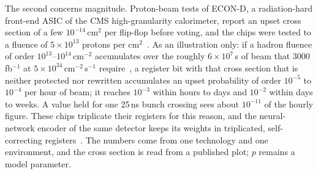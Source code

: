 The second concerns magnitude. Proton-beam tests of ECON-D, a radiation-hard front-end ASIC of the CMS high-granularity calorimeter, report an upset cross section of a few $10^{-14}$\,cm$^2$ per flip-flop before voting, and the chips were tested to a fluence of $5\times10^{13}$ protons per cm$^2$~\cite{cummings2023econd}. As an illustration only: if a hadron fluence of order $10^{13}$--$10^{14}$\,cm$^{-2}$ accumulates over the roughly $6\times10^{7}$\,s of beam that 3000\,fb$^{-1}$ at $5\times10^{34}$\,cm$^{-2}$\,s$^{-1}$ require~\cite{hllhc2017tdr}, a register bit with that cross section that is neither protected nor rewritten accumulates an upset probability of order $10^{-5}$ to $10^{-4}$ per hour of beam; it reaches $10^{-3}$ within hours to days and $10^{-2}$ within days to weeks. A value held for one 25\,ns bunch crossing sees about $10^{-11}$ of the hourly figure. These chips triplicate their registers for this reason, and the neural-network encoder of the same detector keeps its weights in triplicated, self-correcting registers~\cite{diguglielmo2021reconfigurable}. The numbers come from one technology and one environment, and the cross section is read from a published plot; $p$ remains a model parameter.

